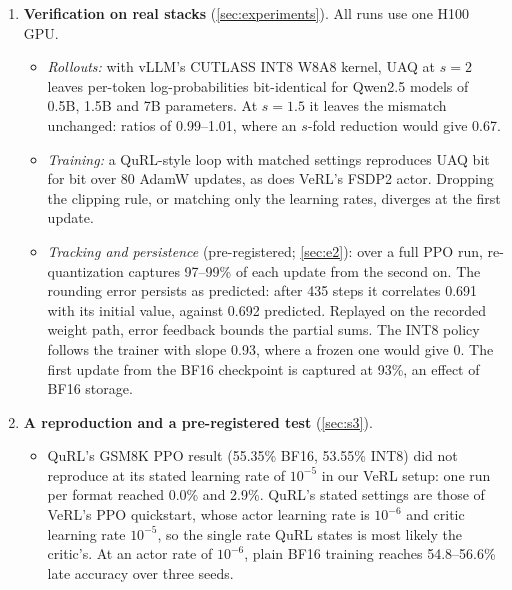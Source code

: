 \begin{enumerate}[leftmargin=*,itemsep=2pt]
  \begin{itemize}[leftmargin=*,itemsep=1pt]
  \item With full-precision master weights, the rollout weights never lag by more than one grid step.
  \item Under a uniform-phase condition, a sub-grid update $\delta$ flips a code with probability $|\delta|/\Delta$, so updates are captured in expectation.
  \item What re-quantization does produce is a rounding error that is stationary in size but persistent in time. We derive its autocorrelation.
  \item We compare four rollout-quantization schemes by their cumulative error: round-to-nearest, delta, stochastic rounding and error feedback.
  \end{itemize}
\item \textbf{Verification on real stacks} (\cref{sec:experiments}). All runs use one H100 GPU.
  \begin{itemize}[leftmargin=*,itemsep=1pt]
  \item \emph{Rollouts:} with vLLM's CUTLASS INT8 W8A8 kernel, UAQ at $s=2$ leaves per-token log-probabilities bit-identical for Qwen2.5 models of 0.5B, 1.5B and 7B parameters. At $s=1.5$ it leaves the mismatch unchanged: ratios of 0.99--1.01, where an $s$-fold reduction would give 0.67.
  \item \emph{Training:} a QuRL-style loop with matched settings reproduces UAQ bit for bit over 80 AdamW updates, as does VeRL's FSDP2 actor. Dropping the clipping rule, or matching only the learning rates, diverges at the first update.
  \item \emph{Tracking and persistence} (pre-registered; \cref{sec:e2}): over a full PPO run, re-quantization captures 97--99\% of each update from the second on. The rounding error persists as predicted: after 435 steps it correlates 0.691 with its initial value, against 0.692 predicted. Replayed on the recorded weight path, error feedback bounds the partial sums. The INT8 policy follows the trainer with slope 0.93, where a frozen one would give 0. The first update from the BF16 checkpoint is captured at 93\%, an effect of BF16 storage.
  \end{itemize}
\item \textbf{A reproduction and a pre-registered test} (\cref{sec:s3}).
  \begin{itemize}[leftmargin=*,itemsep=1pt]
  \item QuRL's GSM8K PPO result (55.35\% BF16, 53.55\% INT8) did not reproduce at its stated learning rate of $10^{-5}$ in our VeRL setup: one run per format reached 0.0\% and 2.9\%. QuRL's stated settings are those of VeRL's PPO quickstart, whose actor learning rate is $10^{-6}$ and critic learning rate $10^{-5}$, so the single rate QuRL states is most likely the critic's. At an actor rate of $10^{-6}$, plain BF16 training reaches 54.8--56.6\% late accuracy over three seeds.

\end{itemize}
\end{enumerate}
